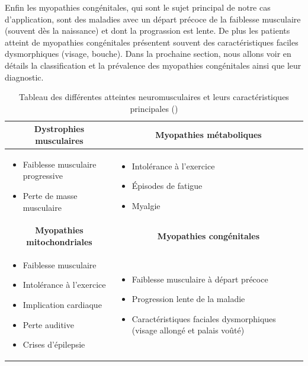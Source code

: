 Enfin les myopathies congénitales, qui sont le sujet principal de notre cas d'application, sont des maladies avec un départ précoce de la faiblesse musculaire (souvent dès la naissance) et dont la prograssion est lente. De plus les patients atteint de myopathies congénitales présentent souvent des caractéristiques faciles dysmorphiques (visage, bouche). Dans la prochaine section, nous allons voir en détails la classification et la prévalence des myopathies congénitales ainsi que leur diagnostic.
\begin{table}[!htbp]
\centering
\begin{tabularx}{\textwidth}{|X|X|}
 \hline
\multicolumn{1}{|c|}{\rowcolor{Gray}\textbf{Dystrophies musculaires}} & \multicolumn{1}{|c|}{\textbf{Myopathies métaboliques}} \\
\hline
\begin{itemize}
\item Faiblesse musculaire progressive
\item Perte de masse musculaire
\end{itemize} &
\begin{itemize}
\item Intolérance à l'exercice
\item Épisodes de fatigue
\item Myalgie
\end{itemize} \\
\hline

\multicolumn{1}{|c|}{\rowcolor{Gray}\textbf{Myopathies mitochondriales}} & \multicolumn{1}{|c|}{\textbf{Myopathies congénitales}} \\
\hline
\begin{itemize}
\item Faiblesse musculaire
\item Intolérance à l'exercice
\item Implication cardiaque
\item Perte auditive
\item Crises d'épilepsie
\end{itemize} &
\begin{itemize}
\item Faiblesse musculaire à départ précoce
\item Progression lente de la maladie
\item Caractéristiques faciales dysmorphiques (visage allongé et palais voûté)
\end{itemize} \\
\hline
\end{tabularx}

\caption{Tableau des différentes atteintes neuromusculaires et leurs caractéristiques principales (\cite{lornage_identification_2019})}
\label{table:nmd}
\end{table}

